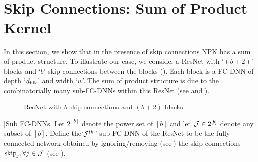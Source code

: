 \section{Skip Connections: Sum of Product Kernel}\label{sec:res}
In this section, we show that in the presence of skip connections NPK has a sum of product structure. To illustrate our case, we consider a ResNet with `$(b+2)$' blocks and `$b$' skip connections between the blocks (). Each block is a FC-DNN of depth `$d_{\text{blk}}$' and width `$w$'. The sum of product structure is due to the combinatorially many sub-FC-DNNs within this ResNet (see  and ).
\FloatBarrier
\begin{figure}[h]
\caption{\small{ResNet with $b$ skip connections and $(b+2)$ blocks.}}
\label{fig:resnet}
\end{figure}
\begin{definition}\label{def:subfcdnn}[Sub FC-DNNs]
Let $2^{[b]}$ denote the power set of $[b]$ and let $\mathcal{J}\in 2^{[b]}$ denote any subset of $[b]$. Define the`$\mathcal{J}^{th}$' sub-FC-DNN of the ResNet to be the fully connected network obtained by ignoring/removing (see ) the skip connections $\text{skip}_j,\forall j\in \mathcal{J}$ (see ).
\end{definition}
\FloatBarrier
